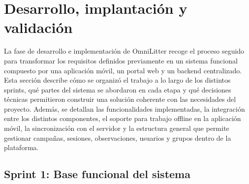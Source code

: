 \chapter{Desarrollo, implantación y validación}
\label{sec:desarrollo_implantacion_validacion}

\newcommand{\sprintHoursTable}[7]{%
\begin{table}[H]
\centering
\caption{Resumen de horas reales del Sprint #1.}
\label{tab:horas_sprint_#1}
\small
\renewcommand{\arraystretch}{1.18}
\begin{tabularx}{0.88\textwidth}{@{}X>{\raggedleft\arraybackslash}p{2.2cm}@{}}
\toprule
\multicolumn{2}{c}{\textbf{Horas del Sprint #1}} \\
\midrule
Horas planificadas del Sprint & #2 \\
Horas reales (Alejandro Castilla) & #3 \\
Horas reales (Ignacio Martínez Díaz) & #4 \\
Horas reales totales del Sprint & #5 \\
Horas acumuladas planificadas hasta este Sprint & #6 \\
Horas acumuladas reales hasta este Sprint & #7 \\
\bottomrule
\end{tabularx}
\end{table}
}

\newcommand{\manualCaseCell}[2]{\textbf{#1}\\[0.35em]#2}

La fase de desarrollo e implementación de OmniLitter recoge el proceso seguido para transformar los requisitos definidos previamente en un sistema funcional compuesto por una aplicación móvil, un portal web y un backend centralizado. Esta sección describe cómo se organizó el trabajo a lo largo de los distintos sprints, qué partes del sistema se abordaron en cada etapa y qué decisiones técnicas permitieron construir una solución coherente con las necesidades del proyecto. Además, se detallan las funcionalidades implementadas, la integración entre los distintos componentes, el soporte para trabajo offline en la aplicación móvil, la sincronización con el servidor y la estructura general que permite gestionar campañas, sesiones, observaciones, usuarios y grupos dentro de la plataforma.


\clearpage
\section{Sprint 1: Base funcional del sistema}
